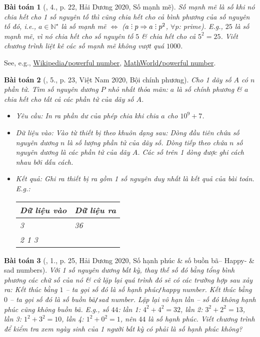\documentclass{article}
\newtheorem{baitoan}{Bài toán}
\DeclareRobustCommand{\divby}{%
	\mathrel{\vbox{\baselineskip.65ex\lineskiplimit0pt\hbox{.}\hbox{.}\hbox{.}}}%
}
\begin{document}
\begin{baitoan}[\cite{VietSTEM2021}, 4., p. 22, Hải Dương 2020, Số mạnh mẽ]
	\emph{Số mạnh mẽ} là số khi nó chia hết cho 1 số nguyên tố thì cũng chia hết cho cả bình phương của số nguyên tố đó, i.e., $a\in\mathbb{N}^\star$ là số mạnh mẽ $\Leftrightarrow$ ($a\divby p\Rightarrow a\divby p^2$, $\forall p$: prime). E.g., $25$ là số mạnh mẽ, vì nó chia hết cho số nguyên tố $5$ \& chia hết cho cả $5^2 = 25$. Viết chương trình liệt kê các số mạnh mẽ không vượt quá $1000$.
\end{baitoan}
See, e.g., \href{https://en.wikipedia.org/wiki/Powerful_number}{Wikipedia\texttt{/}powerful number}, \href{https://mathworld.wolfram.com/PowerfulNumber.html}{MathWorld\texttt{/}powerful number}.

\begin{baitoan}[\cite{VietSTEM2021}, 5., p. 23, Việt Nam 2020, Bội chính phương]
	Cho 1 dãy số $A$ có $n$ phần tử. Tìm số nguyên dương $P$ nhỏ nhất thỏa mãn: $a$ là số chính phương \& $a$ chia hết cho tất cả các phần tử của dãy số $A$.
	\begin{itemize}
		\item {\sf Yêu cầu:} In ra phần dư của phép chia khi chia $a$ cho $10^9 + 7$.
		\item {\sf Dữ liệu vào:} Vào từ thiết bị theo khuôn dạng sau: Dòng đầu tiên chứa số nguyên dương $n$ là số lượng phần tử của dãy số. Dòng tiếp theo chứa $n$ số nguyên dương là các phần tử của dãy $A$. Các số trên 1 dòng được ghi cách nhau bởi dấu cách.
		\item {\sf Kết quả:} Ghi ra thiết bị ra gồm 1 số nguyên duy nhất là kết quả của bài toán. E.g.:
		\begin{table}[H]
			\centering
			\begin{tabular}{|l|l|}
				\hline
				Dữ liệu vào & Dữ liệu ra \\
				\hline
				3 & 36 \\
				2 1 3 &  \\
				\hline
			\end{tabular}
		\end{table}
	\end{itemize}
\end{baitoan}

\begin{baitoan}[\cite{VietSTEM2021}, 1., p. 25, Hải Dương 2020, Số hạnh phúc \& số buồn bã-- Happy- \& sad numbers]
	Với 1 số nguyên dương bất kỳ, thay thế số đó bằng tổng bình phương các chữ số của nó \& cứ lặp lại quá trình đó sẽ có các trường hợp sau xảy ra: Kết thúc bằng $1$ -- ta gọi số đó là \emph{số hạnh phúc\texttt{/}happy number}. Kết thúc bằng $0$ -- ta gọi số đó là \emph{số buồn bã\texttt{/}sad number}. Lặp lại vô hạn lần -- số đó không hạnh phúc cũng không buồn bã. E.g., số $44$: lần 1: $4^2 + 4^2 = 32$, lần 2: $3^2 + 2^2 = 13$, lần 3: $1^2 + 3^2 = 10$, lần 4: $1^2 + 0^2 = 1$, nên $44$ là số hạnh phúc. Viết chương trình để kiểm tra xem ngày sinh của 1 người bất kỳ có phải là số hạnh phúc không?
\end{baitoan}
\end{document}
